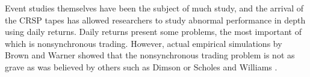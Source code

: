 Event studies themselves have been the subject of much study, and the arrival of the CRSP tapes has allowed researchers to study abnormal performance in depth using daily returns. Daily returns present some problems, the most important of which is nonsynchronous trading. However, actual empirical simulations by Brown and Warner \cite{brownwarner83} showed that the nonsynchronous trading problem is not as grave as was believed by others such as Dimson \cite{dimson79} or Scholes and Williams \cite{scholes77}.
